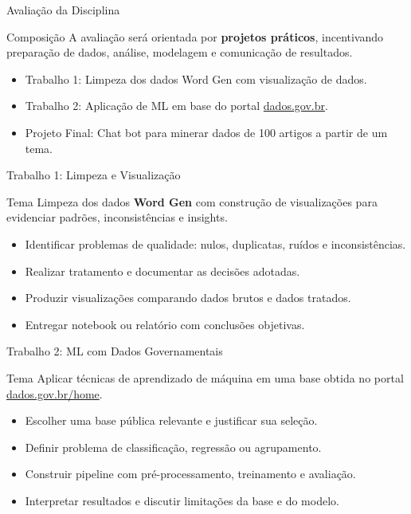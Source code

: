 \documentclass[aspectratio=169]{beamer}
\begin{document}
\begin{frame}{Avaliação da Disciplina}
    \begin{block}{Composição}
        A avaliação será orientada por \textbf{projetos práticos}, incentivando preparação de dados, análise, modelagem e comunicação de resultados.
    \end{block}

    \vspace{0.2cm}
    \begin{itemize}
        \item Trabalho 1: Limpeza dos dados Word Gen com visualização de dados.
        \item Trabalho 2: Aplicação de ML em base do portal \href{https://dados.gov.br/home}{dados.gov.br}.
        \item Projeto Final: Chat bot para minerar dados de 100 artigos a partir de um tema.
    \end{itemize}
\end{frame}

\begin{frame}{Trabalho 1: Limpeza e Visualização}
    \small
    \begin{block}{Tema}
        Limpeza dos dados \textbf{Word Gen} com construção de visualizações para evidenciar padrões, inconsistências e insights.
    \end{block}

    \begin{itemize}
        \item Identificar problemas de qualidade: nulos, duplicatas, ruídos e inconsistências.
        \item Realizar tratamento e documentar as decisões adotadas.
        \item Produzir visualizações comparando dados brutos e dados tratados.
        \item Entregar notebook ou relatório com conclusões objetivas.
    \end{itemize}
\end{frame}

\begin{frame}{Trabalho 2: ML com Dados Governamentais}
    \small
    \begin{block}{Tema}
        Aplicar técnicas de aprendizado de máquina em uma base obtida no portal \href{https://dados.gov.br/home}{dados.gov.br/home}.
    \end{block}

    \begin{itemize}
        \item Escolher uma base pública relevante e justificar sua seleção.
        \item Definir problema de classificação, regressão ou agrupamento.
        \item Construir pipeline com pré-processamento, treinamento e avaliação.
        \item Interpretar resultados e discutir limitações da base e do modelo.
    \end{itemize}
\end{frame}
\end{document}
